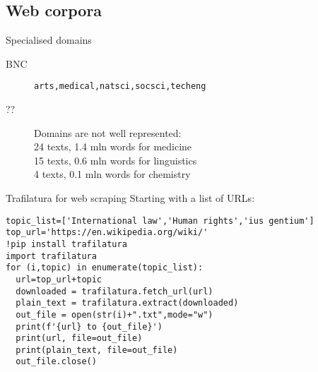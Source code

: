 \documentclass[handout]{beamer}
\begin{document}
\subsection{Web corpora}

\begin{frame}[<+->]{Specialised domains}
 \begin{description}
\item[{BNC}] \verb~arts,medical,natsci,socsci,techeng~
\item[{??}] Domains are not well represented:\\
24 texts, 1.4 mln words for medicine\\
  15 texts, 0.6 mln words for linguistics\\
  4 texts, 0.1 mln words for chemistry
\end{description}
\end{frame}

\begin{frame}[fragile]{Trafilatura for web scraping}
  Starting with a list of URLs:
\begin{verbatim}
topic_list=['International law','Human rights','ius gentium']
top_url='https://en.wikipedia.org/wiki/'
!pip install trafilatura
import trafilatura
for (i,topic) in enumerate(topic_list):
  url=top_url+topic
  downloaded = trafilatura.fetch_url(url)
  plain_text = trafilatura.extract(downloaded)
  out_file = open(str(i)+".txt",mode="w")
  print(f'{url} to {out_file}')
  print(url, file=out_file)
  print(plain_text, file=out_file)
  out_file.close()
\end{verbatim}
\end{frame}


\end{document}
